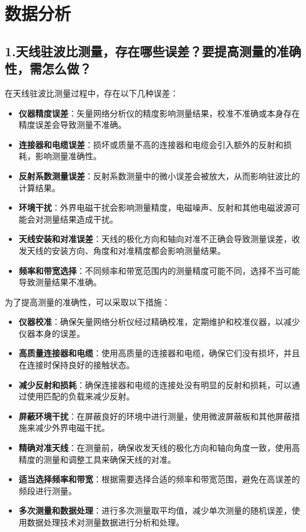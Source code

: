\documentclass[12pt,hyperref,a4paper,UTF8]{ctexart}
\begin{document}
\section{数据分析}

\subsection*{1.天线驻波比测量，存在哪些误差？要提高测量的准确性，需怎么做？}

在天线驻波比测量过程中，存在以下几种误差：

\begin{itemize}
    \item \textbf{仪器精度误差}：矢量网络分析仪的精度影响测量结果，校准不准确或本身存在精度误差会导致测量不准确。
    \item \textbf{连接器和电缆误差}：损坏或质量不高的连接器和电缆会引入额外的反射和损耗，影响测量准确性。
    \item \textbf{反射系数测量误差}：反射系数测量中的微小误差会被放大，从而影响驻波比的计算结果。
    \item \textbf{环境干扰}：外界电磁干扰会影响测量精度，电磁噪声、反射和其他电磁波源可能会对测量结果造成干扰。
    \item \textbf{天线安装和对准误差}：天线的极化方向和轴向对准不正确会导致测量误差，收发天线的安装方向、角度和对准精度都会影响测量结果。
    \item \textbf{频率和带宽选择}：不同频率和带宽范围内的测量精度可能不同，选择不当可能导致测量结果不准确。
\end{itemize}

为了提高测量的准确性，可以采取以下措施：

\begin{itemize}
    \item \textbf{仪器校准}：确保矢量网络分析仪经过精确校准，定期维护和校准仪器，以减少仪器本身的误差。
    \item \textbf{高质量连接器和电缆}：使用高质量的连接器和电缆，确保它们没有损坏，并且在连接时保持良好的接触状态。
    \item \textbf{减少反射和损耗}：确保连接器和电缆的连接处没有明显的反射和损耗，可以通过使用匹配的负载来减少反射。
    \item \textbf{屏蔽环境干扰}：在屏蔽良好的环境中进行测量，使用微波屏蔽板和其他屏蔽措施来减少外界电磁干扰。
    \item \textbf{精确对准天线}：在测量前，确保收发天线的极化方向和轴向角度一致，使用高精度的测量和调整工具来确保天线的对准。
    \item \textbf{适当选择频率和带宽}：根据需要选择合适的频率和带宽范围，避免在高误差的频段进行测量。
    \item \textbf{多次测量和数据处理}：进行多次测量取平均值，减少单次测量的随机误差，使用数据处理技术对测量数据进行分析和处理。
\end{itemize}
\end{document}

